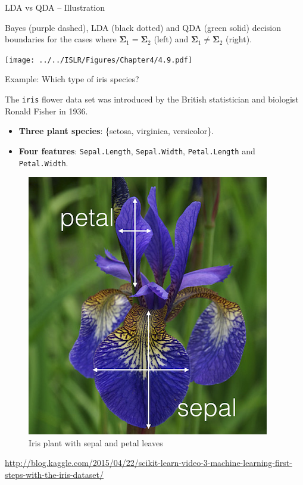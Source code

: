 \documentclass[
  10pt,
  ignorenonframetext,
]{beamer}
\providecommand{\tightlist}{%
  \setlength{\itemsep}{0pt}\setlength{\parskip}{0pt}}
\begin{document}
\begin{frame}
\begin{block}{LDA vs QDA -- Illustration}
\protect\hypertarget{lda-vs-qda-illustration}{}
\vspace{1mm}

Bayes (purple dashed), LDA (black dotted) and QDA (green solid) decision
boundaries for the cases where
\(\boldsymbol{\Sigma}_1 = \boldsymbol{\Sigma}_2\) (left) and
\(\boldsymbol{\Sigma}_1 \neq \boldsymbol{\Sigma}_2\) (right).

\centering

\texttt{[image: ../../ISLR/Figures/Chapter4/4.9.pdf]}
\end{block}
\end{frame}

\begin{frame}[fragile]
\begin{block}{Example: Which type of iris species?}
\protect\hypertarget{example-which-type-of-iris-species}{}
\(~\)

The \texttt{iris} flower data set was introduced by the British
statistician and biologist Ronald Fisher in 1936.

\vspace{2mm}

\begin{itemize}
\tightlist
\item
  \textbf{Three plant species}: \{setosa, virginica, versicolor\}.
\item
  \textbf{Four features}: \texttt{Sepal.Length}, \texttt{Sepal.Width},
  \texttt{Petal.Length} and \texttt{Petal.Width}.
\end{itemize}

\begin{figure}
\includegraphics[width=0.3\linewidth]{iris} \caption{Iris plant with sepal and petal leaves}\label{fig:iris_pic}
\end{figure}
\vspace{-2mm}
\tiny

\url{http://blog.kaggle.com/2015/04/22/scikit-learn-video-3-machine-learning-first-steps-with-the-iris-dataset/}
\end{block}
\end{frame}
\end{document}
